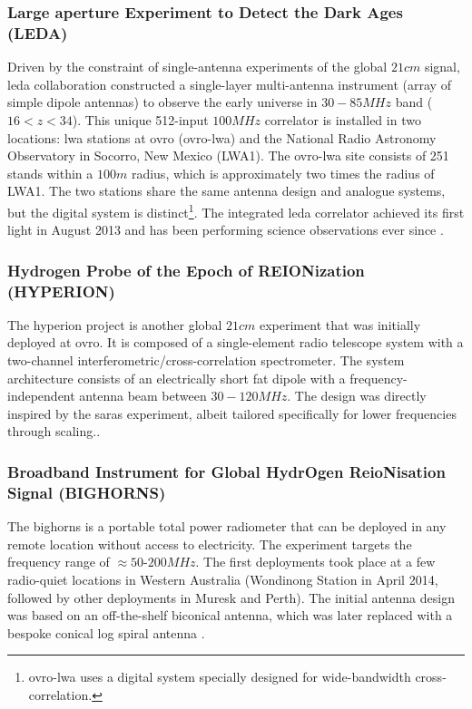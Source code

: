 \documentclass[12pt, TexShade, letterpaper]{report}
\begin{document}
\subsubsection{Large aperture Experiment to Detect the Dark Ages (LEDA)}
Driven by the constraint of single-antenna experiments of the global $21cm$ signal, \gls{leda} collaboration constructed a single-layer multi-antenna instrument (array of simple dipole antennas) to observe the early universe in $30-85MHz$ band ($16 < z < 34$).
This unique 512-input $100MHz$ correlator is installed in two locations: \gls{lwa} stations at \gls{ovro} (\gls{ovro}-\gls{lwa}) and the National Radio Astronomy Observatory in Socorro, New Mexico (LWA1). 
The \gls{ovro}-\gls{lwa} site consists of 251 stands within a $100m$ radius, which is approximately two times the radius of LWA1. The two stations share the same antenna design and analogue systems, but the digital system is distinct\footnote{\gls{ovro}-\gls{lwa} uses a digital system specially designed for wide-bandwidth cross-correlation.}. The integrated \gls{leda} correlator achieved its first light in August 2013 and has been performing science observations ever since \cite{leda_beam, leda_foreground, leda_1, leda_2, leda_design}.\par

\subsubsection{Hydrogen Probe of the Epoch of REIONization (HYPERION)}
The \gls{hyperion} project is another global $21cm$ experiment that was initially deployed at \gls{ovro}. It is composed of a single-element radio telescope system with a two-channel interferometric/cross-correlation spectrometer. The system architecture consists of an electrically short fat dipole with a frequency-independent antenna beam between $30-120 MHz$. The design was directly inspired by the \gls{saras} experiment, albeit tailored specifically for lower frequencies through scaling.\cite{hyperion_1, hyperion_2, hyperion_3}.\par

\subsubsection{Broadband Instrument for Global HydrOgen ReioNisation Signal (BIGHORNS)}
The \gls{bighorns} is a portable total power radiometer that can be deployed in any remote location without access to electricity. The experiment targets the frequency range of $\approx 50 \text{-} 200 MHz$. The first deployments took place at a few radio-quiet locations in Western Australia (Wondinong Station in April 2014, followed by other deployments in  Muresk and Perth). The initial antenna design was based on an off-the-shelf biconical antenna, which was later replaced with a bespoke conical log spiral antenna \cite{bighorns_1}.
\end{document}
